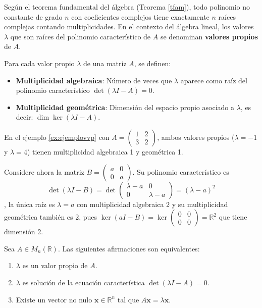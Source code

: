 Según el teorema fundamental del álgebra (Teorema \ref{tfam}), todo polinomio no constante de grado $n$ con coeficientes complejos tiene exactamente $n$ raíces complejas contando multiplicidades. En el contexto del álgebra lineal, los valores $\lambda$ que son raíces del polinomio característico de $A$ se denominan \textbf{valores propios} de $A$.

\begin{definition}\label{multiplicidadgeometrica}
Para cada valor propio $\lambda$ de una matriz $A$, se definen:
\begin{itemize}
    \item \textbf{Multiplicidad algebraica}: Número de veces que $\lambda$ aparece como raíz del polinomio característico $\det(\lambda I - A) = 0$.
    \item \textbf{Multiplicidad geométrica}: Dimensión del espacio propio asociado a $\lambda$, es decir: \(\dim \ker(\lambda I - A).\)
\end{itemize}
\end{definition}

\begin{rem}
En el ejemplo \ref{ex:ejemplovvp} con $A = \begin{pmatrix} 1 & 2 \\ 3 & 2 \end{pmatrix}$, ambos valores propios ($\lambda = -1$ y $\lambda = 4$) tienen multiplicidad algebraica 1 y geométrica 1. 

Considere ahora la matriz $B = \begin{pmatrix} a & 0 \\ 0 & a \end{pmatrix}$. Su polinomio característico es \[
\det(\lambda I - B) = \det\begin{pmatrix} \lambda - a & 0 \\ 0 & \lambda - a \end{pmatrix} = (\lambda - a)^2 \], la única raíz es $\lambda = a$ con multiplicidad algebraica 2 y su multiplicidad geométrica también es 2, pues \(
\ker(aI - B) = \ker\begin{pmatrix} 0 & 0 \\ 0 & 0 \end{pmatrix} = \mathbb{R}^2
\) que tiene dimensión 2.
\end{rem}




\begin{theorem}\label{teo:caracterizacion}
Sea $A \in M_n(\mathbb{R})$. Las siguientes afirmaciones son equivalentes:
\begin{enumerate}[$(1)$]
    \item $\lambda$ es un valor propio de $A$.
    \item $\lambda$ es solución de la ecuación característica $\det(\lambda I - A) = 0$.
    \item Existe un vector no nulo $\mathbf{x} \in \mathbb{R}^n$ tal que $A\mathbf{x} = \lambda \mathbf{x}$.
\end{enumerate}
\end{theorem}

